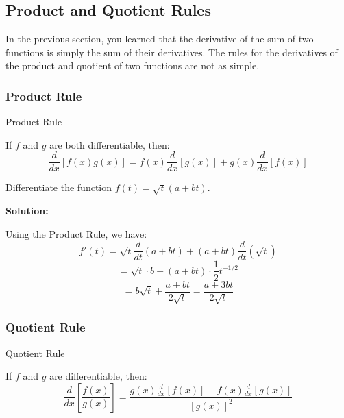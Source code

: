 \documentclass[12pt]{article}
\theoremstyle{beautifulthm}
\begin{document}
\newpage
\subsection{ Product and Quotient Rules}

In the previous section, you learned that the derivative of the sum of two functions is simply the sum of their derivatives. The rules for the derivatives of the product and quotient of two functions are not as simple.
\subsubsection{Product Rule}
\begin{mytheorem}{Product Rule}{}

If \( f \) and \( g \) are both differentiable, then:
\[
\frac{d}{dx} [f(x)g(x)] = f(x) \frac{d}{dx} [g(x)] + g(x) \frac{d}{dx} [f(x)]
\]
\end{mytheorem}

\begin{tcolorbox}[colback=examplebg, colframe=red!75!black, title=\textbf{EXAMPLE 1: Using the Product Rule}, fonttitle=\bfseries, sharp corners]
Differentiate the function \( f(t) = \sqrt{t} (a + bt) \).

\tcblower
\textbf{Solution:}

Using the Product Rule, we have:
\[
f'(t) = \sqrt{t} \frac{d}{dt} (a + bt) + (a + bt) \frac{d}{dt} (\sqrt{t})
\]
\[
= \sqrt{t} \cdot b + (a + bt) \cdot \frac{1}{2} t^{-1/2}
\]
\[
= b\sqrt{t} + \frac{a + bt}{2\sqrt{t}} = \frac{a + 3bt}{2\sqrt{t}}
\]

\end{tcolorbox}

\newpage

\subsubsection{Quotient Rule}
\begin{mytheorem}{Quotient Rule}{}

If \( f \) and \( g \) are differentiable, then:
\[
\frac{d}{dx} \left[ \frac{f(x)}{g(x)} \right] = \frac{g(x) \frac{d}{dx} [f(x)] - f(x) \frac{d}{dx} [g(x)]}{[g(x)]^2}
\]
\end{mytheorem}
\end{document}
